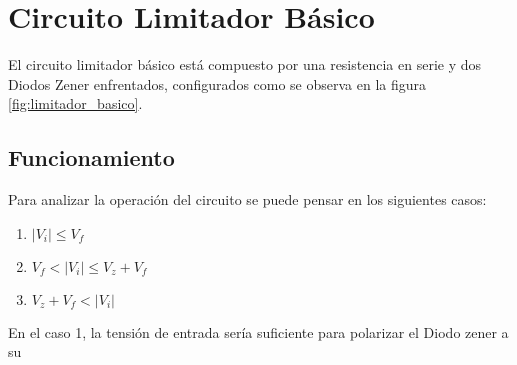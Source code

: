 \chapter{Circuito Limitador Básico}
El circuito limitador básico está compuesto por una resistencia en serie y dos Diodos Zener enfrentados, configurados como se observa en la figura \ref{fig:limitador_basico}.

\begin{figure}[ht]
    \begin{center}
        
        \label{fig:cambiar}
    \end{center}
\end{figure}

\section{Funcionamiento}
Para analizar la operación del circuito se puede pensar en los siguientes casos:

\begin{enumerate}
    \item $|V_i| \leq V_f$
    \item $V_f < |V_i| \leq V_z + V_f$
    \item $V_z + V_f < |V_i|$ 
\end{enumerate}

En el caso 1, la tensión de entrada sería suficiente para polarizar el Diodo zener a su 
